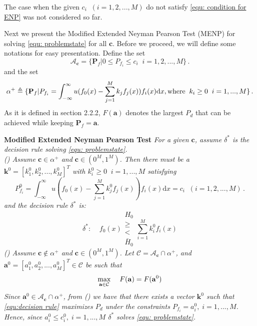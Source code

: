 The case when the given $c_i\;\; (i= 1, 2, ..., M)$ do not satisfy \eqref{equ: condition for ENP} was not considered so far. 


Next we present the Modified Extended Neyman Pearson Test (MENP) for solving \eqref{equ: problemstate} for all $\mathbf{c}$.
Before we proceed, we will define some notations for easy presentation.
Define the set 
\[\mathcal{A}_\mathbf{c} = \{
  \mathbf{P}_f | 0 \leq P_{f_i} \leq c_i
  \;\;i=1, 2, ..., M\}\,.
\]
and the set 
\[
\alpha^+ \triangleq \{\mathbf{P}_f | P_{f_i} = \int_{-\infty}^{\infty} u(f_0(x) - \sum_{j=1}^{M}k_j f_j(x)) f_i(x) \mathrm{d}x, \text{where\;\;} k_i \geq 0 \;\;i=1, ..., M\}\,.
\]
As it is defined in section 2.2.2, $F(\mathbf{a})$ denotes the largest $P_d$ that can be achieved while keeping $\mathbf{P}_{f} = \mathbf{a}$.  

\noindent \textbf{Modified Extended Neyman Pearson Test}
\noindent \textit{
  For a given $\mathbf{c}$, assume $\delta^\ast$ is the decision rule solving \eqref{equ: problemstate}. 
  \\\textnormal{()} Assume $\mathbf{c} \in \alpha^+$ and $\mathbf{c} \in (0^M, 1^M)$. Then there must be a $\mathbf{k}^0 = [k_1^0, k_2^0, ..., k_M^0]^T$ with $k_i^0 \geq 0\;\;i=1, ..., M$ satisfying
}
\begin{equation}
\label{equ:Pf}
  P_{f_i}^0 = \int_{-\infty}^{\infty} u(f_0(x) - \sum_{j=1}^{M}k_j^0f_j(x))f_i(x)\mathrm{d}x = c_i \;\; (i= 1, 2, ..., M)\,.
\end{equation}
\textit{
    and the decision rule $\delta^\ast $ is:
}
\begin{equation}
\label{equ:decision rule}
\delta^\ast:\;\;\;\;f_0(x) \substack{H_0 \\ \geq \\ < \\ \bar{H}_0} \sum_{i=1}^{M}k_i^0f_i(x)
\end{equation}
\textit{
  \noindent \textnormal{()} Assume $\mathbf{c} \notin \alpha^+$ and $\mathbf{c} \in (0^M, 1^M)$. Let $\mathcal{C} = \mathcal{A}_{\mathbf{c}} \cap \alpha^+$, and $\mathbf{a}^0 = [a_1^0, a_2^0, ..., a_M^0]^T \in \mathcal{C}$ be such that
}
\begin{equation}
\label{equ: F0}
\max_{\mathbf{a} \in \mathcal{C}}\;\;\;\;F(\mathbf{a}) = F(\mathbf{a}^0)\\
\end{equation}
\textit{
Since $\mathbf{a}^0 \in \mathcal{A}_{\mathbf{c}} \cap \alpha^+$, from \textnormal{()} we have that there exists a vector $\mathbf{k}^0$ such that \eqref{equ:decision rule}  maximizes $P_d$ under the constraints $P_{f_i} = a_i^0, \;i=1, ..., M$. Hence, since $a_i^0 \leq c_i^0, \;i=1, ..., M$ $\delta^\ast$ solves \eqref{equ: problemstate}.
}

